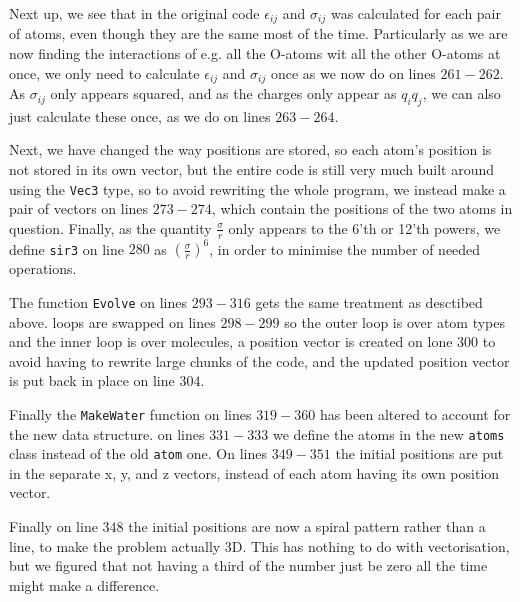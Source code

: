 \documentclass{article}
\begin{document}
Next up, we see that in the original code $\epsilon_{ij}$ and $\sigma_{ij}$ was calculated for each pair of atoms, even though they are the same most of the time. Particularly as we are now finding the interactions of e.g. all the O-atoms wit all the other O-atoms at once, we only need to calculate $\epsilon_{ij}$ and $\sigma_{ij}$ once as we now do on lines $261-262$. As $\sigma_{ij}$ only appears squared, and as the charges only appear as $q_iq_j$, we can also just calculate these once, as we do on lines $263-264$.

Next, we have changed the way positions are stored, so each atom's position is not stored in its own vector, but the entire code is still very much built around using the \texttt{Vec3} type, so to avoid rewriting the whole program, we instead make a pair of vectors on lines $273-274$, which contain the positions of the two atoms in question. Finally, as the quantity $\frac{\sigma}{r}$ only appears to the 6'th or 12'th powers, we define \texttt{sir3} on line $280$ as $\left(\frac{\sigma}{r}\right)^6$, in order to minimise the number of needed operations.

The function \texttt{Evolve} on lines $293-316$ gets the same treatment as desctibed above. loops are swapped on lines $298-299$ so the outer loop is over atom types and the inner loop is over molecules, a position vector is created on lone $300$ to avoid having to rewrite large chunks of the code, and the updated position vector is put back in place on line $304$.

Finally the \texttt{MakeWater} function on lines $319-360$ has been altered to account for the new data structure. on lines $331-333$ we define the atoms in the new \texttt{atoms} class instead of the old \texttt{atom} one. On lines $349-351$ the initial positions are put in the separate x, y, and z vectors, instead of each atom having its own position vector. 

Finally on line $348$ the initial positions are now a spiral pattern rather than a line, to make the problem actually 3D. This has nothing to do with vectorisation, but we figured that not having a third of the number just be zero all the time might make a difference.
\end{document}
